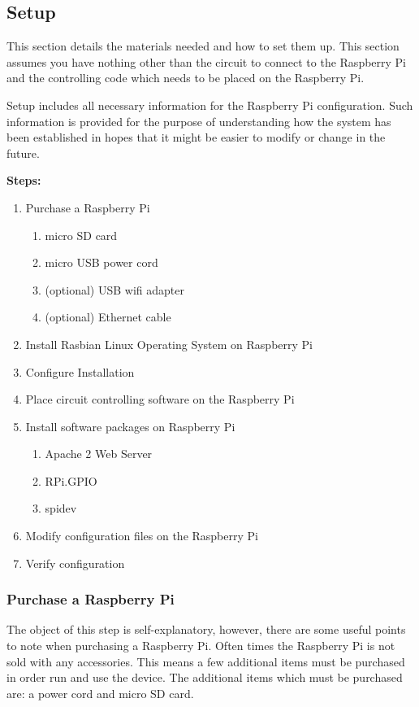 \documentclass{article}	%
\begin{document}
\begin{multicols}{2}
\subsection{Setup}
This section details the materials needed and
how to set them up.
This section assumes you have nothing
other than the
circuit to connect to the Raspberry Pi and
the controlling code which needs to be placed on
the Raspberry Pi.

Setup includes all necessary information
for the Raspberry Pi configuration.
Such information is provided
for the purpose of understanding 
how the system has been established
in hopes that it might be easier to modify or
change in the future.

\textbf{Steps:}
\begin{enumerate}
\item Purchase a Raspberry Pi
    \begin{enumerate}
    \item micro SD card
    \item micro USB power cord
    \item (optional) USB wifi adapter
    \item (optional) Ethernet cable
    \end{enumerate}
\item Install Rasbian Linux Operating System on Raspberry Pi
\item Configure Installation
\item Place circuit controlling software on the Raspberry Pi
\item Install software packages on Raspberry Pi
    \begin{enumerate}
    \item Apache 2 Web Server
    \item RPi.GPIO
    \item spidev
    \end{enumerate}
\item Modify configuration files on the Raspberry Pi
\item Verify configuration
\end{enumerate}

\subsubsection{Purchase a Raspberry Pi}
The object of this step is self-explanatory, however,
there are some useful points to note when purchasing
a Raspberry Pi.
Often times the Raspberry Pi is not sold with any accessories.
This means a few additional items must be purchased
in order run and use the device.
The additional items which must be purchased are:
a power cord and
micro SD card.


\end{multicols}
\end{document}
